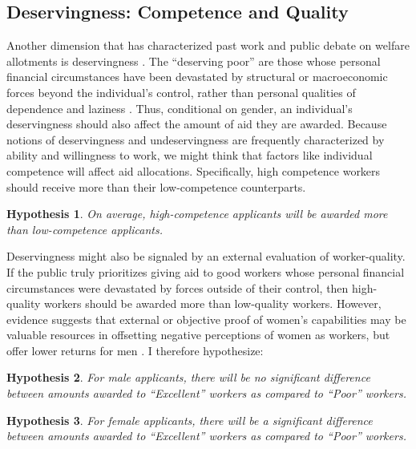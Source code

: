 \documentclass[12pt]{article}%
\newtheorem{hypothesis}{Hypothesis}
\begin{document}
\begin{doublespace}
\subsection{Deservingness: Competence and Quality}
Another dimension that has characterized past work and public debate on welfare allotments is deservingness \citep{schneider_social_1993}. The ``deserving poor” are those whose personal financial circumstances have been devastated by structural or macroeconomic forces beyond the individual’s control, rather than personal qualities of dependence and laziness \citep{van_oorschot_who_nodate}. Thus, conditional on gender, an individual’s deservingness should also affect the amount of aid they are awarded. Because notions of deservingness and undeservingness are frequently characterized by ability and willingness to work, we might think that factors like individual competence will affect aid allocations. Specifically, high competence workers should receive more than their low-competence counterparts.


\begin{hypothesis} \label{hyp:second}
On average, high-competence applicants will be awarded more than low-competence applicants.
\end{hypothesis}


Deservingness might also be signaled by an external evaluation of worker-quality. If the public truly prioritizes giving aid to good workers whose personal financial circumstances were devastated by forces outside of their control, then high-quality workers should be awarded more than low-quality workers. However, evidence suggests that external or objective proof of women’s capabilities may be valuable resources in offsetting negative perceptions of women as workers, but offer lower returns for men \citep{abel_value_2020, dadgar_labor_2015, jepsen_labor-market_2014}. I therefore hypothesize:


\begin{hypothesis} \label{hyp:thirda}
	For male applicants, there will be no significant difference between amounts awarded to ``Excellent” workers as compared to ``Poor” workers.
\end{hypothesis}

\begin{hypothesis} \label{hyp:thirdb}
	For female applicants, there will be a significant difference between amounts awarded to ``Excellent” workers as compared to ``Poor” workers.
\end{hypothesis}



\end{doublespace}
\end{document}
